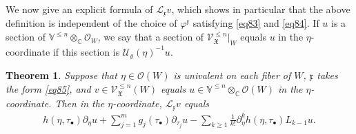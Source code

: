 \documentclass[12pt,a4paper,notitlepage]{report}
\theoremstyle{definition}
\theoremstyle{plain}
\newtheorem{thm}[df]{Theorem}
\newcommand{\fk}{\mathfrak}
\newcommand{\mc}{\mathcal}
\newcommand{\scr}{\mathscr}
\newcommand{\blt}{\bullet}
\newcommand{\Vbb}{\mathbb V}
\newcommand{\Cbb}{\mathbb C}
\numberwithin{equation}{section}
\begin{document}
We now give an explicit formula of $\mc L_{\fk x}v$, which shows in particular that the above definition is independent of the choice of $\varphi^{\fk x}$ satisfying \eqref{eq83} and \eqref{eq84}. If $u$ is a section of $\Vbb^{\leq n}\otimes_{\Cbb}\scr O_{W}$, we say that a section of $\scr V_{\fk X}^{\leq n}|_W$ equals $u$ in the $\eta$-coordinate if this section is $\mc U_\varrho(\eta)^{-1}u$. 




\begin{thm}\label{lb53}
Suppose that $\eta\in\scr O(W)$ is univalent on each fiber of $W$, $\fk x$ takes the form \eqref{eq85}, and $v\in\scr V_{\fk X}^{\leq n}(W)$ equals $u\in\Vbb^{\leq n}\otimes_{\Cbb}\scr O(W)$ in the $\eta$-coordinate. Then in the $\eta$-coordinate,  $\mc L_{\fk x}v$ equals
\begin{align}
h(\eta,\tau_\blt)\partial_\eta u+\sum_{j=1}^m g_j(\tau_\blt)\partial_{\tau_j}u-\sum_{k\geq 1}\frac 1{k!}\partial_\eta^k h(\eta,\tau_\blt)L_{k-1}u.\label{eq87}
\end{align}
\end{thm}	
\end{document}
